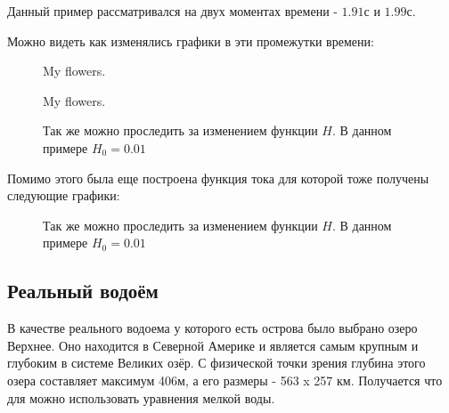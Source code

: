 \documentclass[14pt]{extreport}
\begin{document}
Данный пример рассматривался на двух моментах времени - $1.91$с и $1.99$с.

Можно видеть как изменялись графики в эти промежутки времени:


\begin{figure}[H]
  \centering
  \hfill
  \caption{My flowers.}
\end{figure}


\begin{figure}[H]
  \centering
  \hfill
  \caption{My flowers.}
\end{figure}


\begin{figure}[H]
  \centering
  \hfill
  \caption{
Так же можно проследить за изменением функции $H$. В данном примере $H_0=0.01$}
\end{figure}



Помимо этого была еще построена функция тока для которой тоже получены следующие графики:


\begin{figure}[H]
  \centering
  \hfill
  \caption{
Так же можно проследить за изменением функции $H$. В данном примере $H_0=0.01$}
\end{figure}






\subsection{Реальный водоём}
В качестве реального водоема у которого есть острова было выбрано озеро Верхнее. Оно находится в Северной Америке и является самым крупным и глубоким в системе Великих озёр. С физической точки зрения глубина этого озера составляет максимум 406м, а его размеры - 563 x 257 км. Получается что для можно использовать уравнения мелкой воды.
\end{document}
